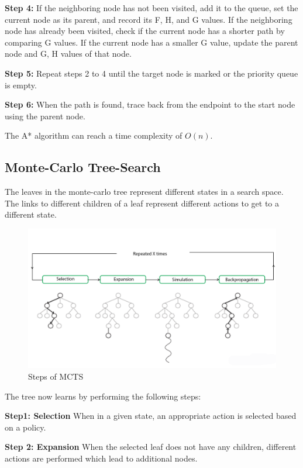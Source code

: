 \documentclass[bibliography=totoc]{scrartcl}
\begin{document}
\textbf{Step 4:} If the neighboring node has not been visited, add it to the queue, set the current node as its parent, and record its F, H, and G values. If the neighboring node has already been visited, check if the current node has a shorter path by comparing G values. If the current node has a smaller G value, update the parent node and G, H values of that node.

\textbf{Step 5:} Repeat steps 2 to 4 until the target node is marked or the priority queue is empty.

\textbf{Step 6:} When the path is found, trace back from the endpoint to the start node using the parent node.

The A* algorithm can reach a time complexity of $O(n)$.

\subsection{Monte-Carlo Tree-Search}
The leaves in the monte-carlo tree represent different states in a search space. The links to different children of a leaf represent different actions to get to a different state.

\begin{figure}[H]
    \centering
    \includegraphics[width = {\textwidth}]{img/mcts_steps.png}
    \caption{Steps of \ac{MCTS}}
    \label{fig:MCTS}
\end{figure}

The tree now learns by performing the following steps:

\textbf{Step1: Selection} When in a given state, an appropriate action is selected based on a policy.

\textbf{Step 2: Expansion} When the selected leaf does not have any children, different actions are performed which lead to additional nodes.
\end{document}

